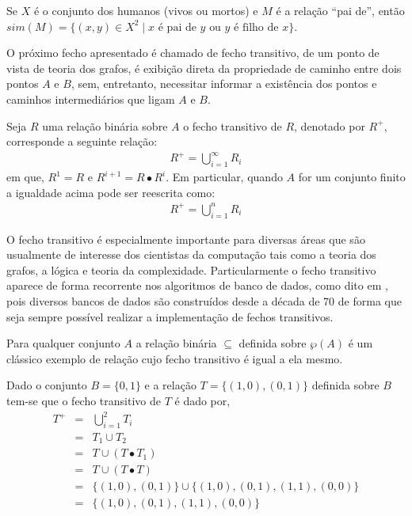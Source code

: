 \begin{exemplo}
	Se $X$ é o conjunto dos humanos (vivos ou mortos) e $M$ é a relação ``pai de'', então $sim(M) = \{(x, y) \in X^2 \mid x \text{ é pai de } y \text{ ou } y \text{ é filho de } x\}$.
\end{exemplo}


O próximo fecho apresentado é chamado de fecho transitivo, de um ponto de vista de teoria dos grafos, é exibição direta da propriedade de caminho entre dois pontos $A$ e $B$, sem, entretanto, necessitar informar a existência dos pontos e caminhos intermediários que ligam $A$ e $B$.

\begin{definicao}\label{def:FechoTransitivo}
	Seja $R$ uma relação binária sobre $A$ o fecho transitivo de $R$, denotado por $R^+$, corresponde a seguinte relação:
	\begin{eqnarray*}
		R^+ = \bigcup_{i = 1}^\infty R_i
	\end{eqnarray*}
	em que, $R^1 = R$ e $R^{i+1} = R \bullet R^i$. Em particular, quando $A$ for um conjunto finito a igualdade acima pode ser reescrita como:
	\begin{eqnarray*}
		R^+ = \bigcup_{i = 1}^n R_i
	\end{eqnarray*}
\end{definicao}

O fecho transitivo é especialmente importante para diversas áreas que são usualmente de interesse dos cientistas da computação tais como a teoria dos grafos, a lógica e teoria da complexidade. Particularmente o fecho transitivo aparece de forma recorrente nos algoritmos de banco de dados, como dito em \cite{Gerard2021discreta}, pois diversos bancos de dados são construídos desde a década de 70 de forma que seja sempre possível realizar a implementação de fechos transitivos.

\begin{exemplo}
	Para qualquer conjunto $A$ a relação binária $\subseteq$ definida sobre $\wp(A)$ é um clássico exemplo de relação cujo fecho transitivo é igual a ela mesmo.
\end{exemplo}

\begin{exemplo}
	Dado o conjunto $B = \{0,1\}$ e a relação $T = \{(1, 0), (0, 1)\}$ definida sobre $B$ tem-se que o fecho transitivo de $T$ é dado por, 
	\begin{eqnarray*}
		T^+ & = & \bigcup_{i = 1}^2 T_i\\
		& = & T_1 \cup T_2\\
		& = & T \cup (T \bullet T_1)\\
		& = & T \cup (T \bullet T)\\
		& = &  \{(1, 0), (0, 1)\} \cup  \{(1, 0), (0, 1), (1, 1), (0, 0)\}\\
		& = &  \{(1, 0), (0, 1), (1, 1), (0, 0)\}\\
	\end{eqnarray*}
\end{exemplo}

